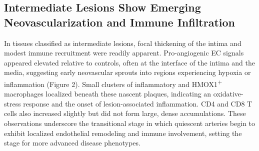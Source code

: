\documentclass[a4paper,12pt]{article}
\begin{document}
\subsection{Intermediate Lesions Show Emerging Neovascularization and Immune Infiltration}
In tissues classified as intermediate lesions, focal thickening of the intima and modest immune recruitment were readily apparent. Pro-angiogenic EC signals appeared elevated relative to controls, often at the interface of the intima and the media, suggesting early neovascular sprouts into regions experiencing hypoxia or inflammation (Figure 2). Small clusters of inflammatory and HMOX1\textsuperscript{+} macrophages localized beneath these nascent plaques, indicating an oxidative-stress response and the onset of lesion-associated inflammation. CD4 and CD8 T cells also increased slightly but did not form large, dense accumulations. These observations underscore the transitional stage in which quiescent arteries begin to exhibit localized endothelial remodeling and immune involvement, setting the stage for more advanced disease phenotypes.
\end{document}
